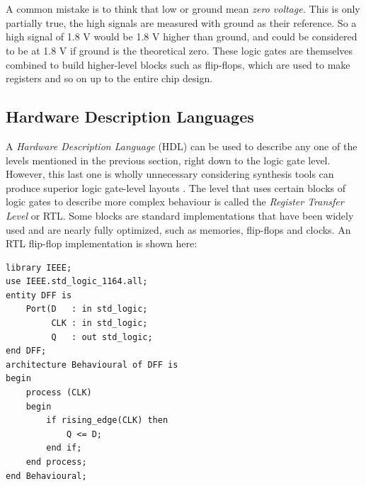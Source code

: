 \documentclass[11pt,british]{article}
\begin{document}
\\
\\
A common mistake is to think that low or ground mean \emph{zero voltage.} This is only partially true, the high signals are measured with ground as their reference. So a high signal of 1.8 V would be 1.8 V higher than ground, and could be considered to be at 1.8 V if ground is the theoretical zero. These logic gates are themselves combined to build higher-level blocks such as flip-flops, which are used to make registers and so on up to the entire chip design.

\pagebreak

\subsection{Hardware Description Languages}

A \emph{Hardware Description Language} (HDL) can be used to describe any one of the levels mentioned in the previous section, right down to the logic gate level. However, this last one is wholly unnecessary considering synthesis tools can produce superior logic gate-level layouts \cite{key-1}. The level that uses certain blocks of logic gates to describe more complex behaviour is called the \emph{Register Transfer Level} or RTL. Some blocks are standard implementations that have been widely used and are nearly fully optimized, such as memories, flip-flops and clocks. An RTL flip-flop implementation is shown here: 
\begin{lstlisting}[tabsize=4, frame=single, framesep=2mm, belowskip=16pt, aboveskip=16pt]
library IEEE;
use IEEE.std_logic_1164.all;
entity DFF is
	Port(D 	 : in std_logic;
		 CLK : in std_logic;
		 Q 	 : out std_logic;
end DFF;
architecture Behavioural of DFF is
begin
	process (CLK)
	begin
		if rising_edge(CLK) then
			Q <= D;
		end if;
	end process;
end Behavioural;
\end{lstlisting}
\end{document}
